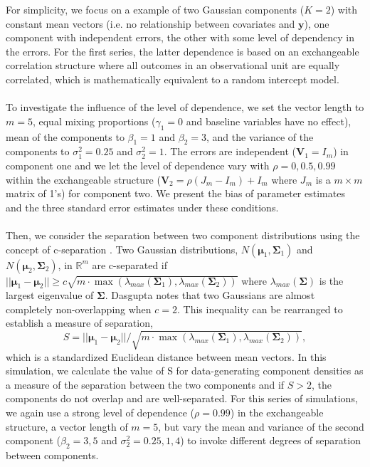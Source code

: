 \documentclass[10pt]{article}
\newcommand{\B}[0]{\mathbf}
\newcommand{\bs}[0]{\boldsymbol}
\begin{document}
 For simplicity, we focus on a example of two Gaussian components ($K = 2$) with constant mean vectors (i.e. no relationship between covariates and $\B y$), one component with independent errors, the other with some level of dependency in the errors. For the first series, the latter dependence is based on an exchangeable correlation structure where all outcomes in an observational unit are equally correlated, which is mathematically equivalent to a random intercept model.\\\\
To investigate the influence of the level of dependence, we set the vector length to $m=5$, equal mixing proportions ($\gamma_{1}=0$ and  baseline variables have no effect), mean of the components to $\beta_{1}=1$ and $\beta_{2}=3$, and the variance of the components to $\sigma^{2}_{1}=0.25$ and $\sigma^{2}_{2}=1$. The errors are independent ($\B V_{1}=I_{m}$) in component one and we let the level of dependence vary with $\rho=0,0.5,0.99$ within the exchangeable structure ($\B V_2 = \rho(J_m-I_m)+I_m$ where $J_m$ is a $m\times m$ matrix of 1's) for component two. We present the bias of parameter estimates and the three standard error estimates under these conditions.\\\\
Then, we consider the separation between two component distributions using the concept of c-separation \cite{dasgupta1999}. Two Gaussian distributions, $N(\bs\mu_{1},\bs\Sigma_{1})$ and $N(\bs\mu_{2},\bs\Sigma_{2})$, in $\mathbb{R}^{m}$ are c-separated if \\
$||\bs\mu_{1}-\bs\mu_{2}||\geq c\sqrt{m\cdot\max(\lambda_{max}(\bs\Sigma_{1}),\lambda_{max}(\bs\Sigma_{2}))}$
where $\lambda_{max}(\bs\Sigma)$ is the largest eigenvalue of $\bs\Sigma$.  Dasgupta \cite{dasgupta1999} notes that two Gaussians are almost completely non-overlapping when $c=2$. This inequality can be rearranged to establish a measure of separation,
$$S = ||\bs\mu_{1}-\bs\mu_{2}||/\sqrt{m\cdot\max(\lambda_{max}(\bs\Sigma_{1}),\lambda_{max}(\bs\Sigma_{2}))},$$
which is a standardized Euclidean distance between mean vectors. In this simulation, we calculate the value of S for data-generating component densities as a measure of the separation between the two components and if $S>2$, the components do not overlap and are well-separated. For this series of simulations, we again use a strong level of dependence ($\rho=0.99$) in the exchangeable structure, a vector length of $m=5$, but vary the mean and variance of the second component ($\beta_{2}=3,5$ and $\sigma_{2}^{2}=0.25,1,4$) to invoke different degrees of separation between components.\\\\
\end{document}
